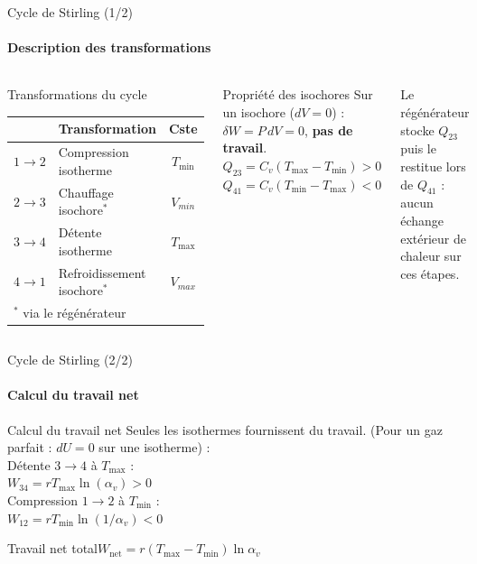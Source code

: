 \documentclass[aspectratio=43, 10pt]{beamer}
\newcommand{\resultbox}[2][R\'esultat cl\'e]{%
  \begin{alertblock}{#1}\centering$\displaystyle #2$\end{alertblock}}
\newcommand{\Tmin}{T_{\min}}
\newcommand{\Tmax}{T_{\max}}
\newcommand{\Wnet}{W_{\text{net}}}
\begin{document}
\begin{frame}{Cycle de Stirling (1/2)}
  \framesubtitle{Description des transformations}

  \begin{columns}[T,onlytextwidth]
      \begin{block}{Transformations du cycle}
        \small
        \renewcommand{\arraystretch}{1.2}
        \begin{tabular}{clc}
          \toprule
          & Transformation & Cste \\
          \midrule
          $1\!\to\!2$ & Compression isotherme      & $\Tmin$ \\
          $2\!\to\!3$ & Chauffage isochore$^*$ & $V_{min}$ \\
          $3\!\to\!4$ & D\'etente isotherme        & $\Tmax$ \\
          $4\!\to\!1$ & Refroidissement isochore$^*$ & $V_{max}$ \\
          \bottomrule
          \multicolumn{3}{l}{\tiny $^*$ via le r\'eg\'en\'erateur}
        \end{tabular}
      \end{block}

      \begin{exampleblock}{Propri\'et\'e des isochores}
        \normalsize
        Sur un isochore ($dV = 0$) :\\[4pt]
        $\delta W = P\,dV = 0$, \textbf{pas de travail}.\\[6pt]
        $Q_{23} = C_v(\Tmax - \Tmin) > 0$\\[4pt]
        $Q_{41} = C_v(\Tmin - \Tmax) < 0$
      \end{exampleblock}
      
      \vspace{1em}
      \small
      Le r\'eg\'en\'erateur stocke $Q_{23}$ puis le
      restitue lors de $Q_{41}$ :
      aucun \'echange ext\'erieur de chaleur sur ces \'etapes.
  \end{columns}
\end{frame}

\begin{frame}{Cycle de Stirling (2/2)}
  \framesubtitle{Calcul du travail net}

  \begin{block}{Calcul du travail net}
    \normalsize
    Seules les isothermes fournissent du travail.
    (Pour un gaz parfait : $dU = 0$ sur une isotherme) :\\[8pt]
    D\'etente $3\!\to\!4$ \`a $\Tmax$ :\\
    $W_{34} = r\Tmax\ln(\alpha_v) > 0$\\[8pt]
    Compression $1\!\to\!2$ \`a $\Tmin$ :\\
    $W_{12} = r\Tmin\ln(1/\alpha_v) < 0$
  \end{block}

  \vspace{1em}
  \resultbox[Travail net total]{%
    \Wnet = r(\Tmax-\Tmin)\ln\alpha_v}
\end{frame}
\end{document}
